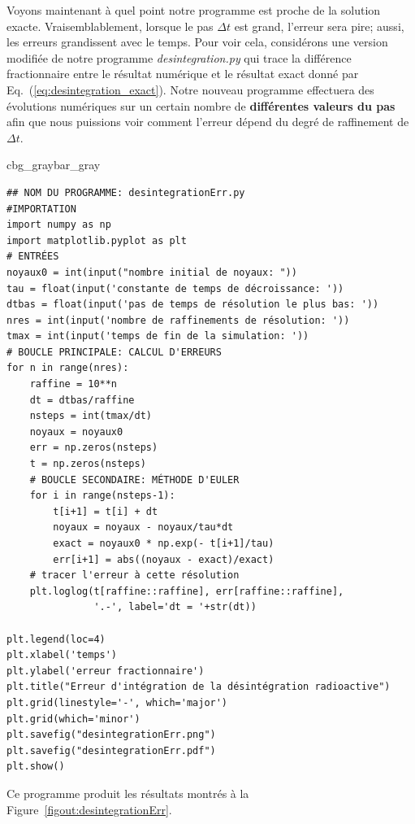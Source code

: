 \documentclass[%
oneside,                 %
final,                   %
10pt]{article}
\newenvironment{_pro_tight}[2]{
   \def\FrameCommand{\color{#2}\vrule width 1mm\normalcolor\colorbox{#1}}
   \FrameRule0.6pt\MakeFramed {\advance\hsize-2mm\FrameRestore}\vskip3mm}
   {\vskip0mm\endMakeFramed}
\newenvironment{pro}[2]{
\bgroup\rmfamily
\fboxsep=0mm\relax
\begin{_pro_tight}{#1}{#2}
\list{}{\parsep=-2mm\parskip=0mm\topsep=0pt\leftmargin=2mm
\rightmargin=2\leftmargin\leftmargin=4pt\relax}
\item\relax}
{\endlist\end{_pro_tight}\egroup}
\begin{document}
Voyons maintenant à quel point notre programme est proche de la solution exacte. Vraisemblablement, lorsque le pas $\Delta t$ est grand, l'erreur sera pire; aussi, les erreurs grandissent avec le temps. Pour voir cela, considérons une version modifiée de notre programme \emph{desintegration.py} qui trace la différence fractionnaire entre le résultat numérique et le résultat exact donné par Eq.~(\ref{eq:desintegration_exact}). Notre nouveau programme effectuera des évolutions numériques sur un certain nombre de \textbf{différentes valeurs du pas} afin que nous puissions voir comment l'erreur dépend du degré de raffinement de $\Delta t$.

\begin{pro}{cbg_gray}{bar_gray}\begin{verbatim}
## NOM DU PROGRAMME: desintegrationErr.py
#IMPORTATION
import numpy as np
import matplotlib.pyplot as plt
# ENTRÉES
noyaux0 = int(input("nombre initial de noyaux: "))
tau = float(input('constante de temps de décroissance: '))
dtbas = float(input('pas de temps de résolution le plus bas: '))
nres = int(input('nombre de raffinements de résolution: '))
tmax = int(input('temps de fin de la simulation: '))
# BOUCLE PRINCIPALE: CALCUL D'ERREURS
for n in range(nres):
    raffine = 10**n
    dt = dtbas/raffine
    nsteps = int(tmax/dt)
    noyaux = noyaux0
    err = np.zeros(nsteps)
    t = np.zeros(nsteps)
    # BOUCLE SECONDAIRE: MÉTHODE D'EULER
    for i in range(nsteps-1):
        t[i+1] = t[i] + dt
        noyaux = noyaux - noyaux/tau*dt
        exact = noyaux0 * np.exp(- t[i+1]/tau)
        err[i+1] = abs((noyaux - exact)/exact)
    # tracer l'erreur à cette résolution
    plt.loglog(t[raffine::raffine], err[raffine::raffine],
               '.-', label='dt = '+str(dt))
    
plt.legend(loc=4)
plt.xlabel('temps')
plt.ylabel('erreur fractionnaire')
plt.title("Erreur d'intégration de la désintégration radioactive")
plt.grid(linestyle='-', which='major')
plt.grid(which='minor')
plt.savefig("desintegrationErr.png")
plt.savefig("desintegrationErr.pdf")
plt.show()
\end{verbatim}
\end{pro}
\noindent

Ce programme produit les résultats montrés à la Figure~\ref{figout:desintegrationErr}.
\end{document}
